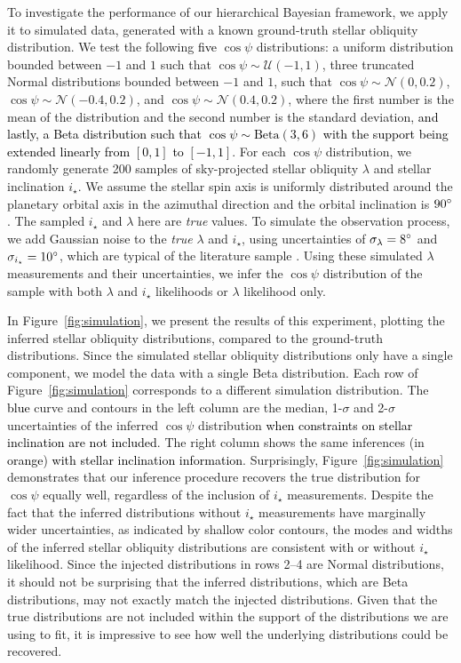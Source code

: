 \documentclass[twocolumn,times]{aastex631}
\newcommand{\edits}[1]{\textcolor{black}{#1}}
\begin{document}
To investigate the performance of our hierarchical Bayesian framework, we apply it to simulated data, generated with a known ground-truth stellar obliquity distribution.
We test the following \edits{five} $\cos{\psi}$ distributions: a uniform distribution bounded between $-1$ and $1$ such that $\cos{\psi} \sim \mathcal{U}(-1,1)$, three truncated Normal distributions bounded between $-1$ and $1$, such that $\cos{\psi} \sim \mathcal{N}(0, 0.2)$, $\cos{\psi} \sim \mathcal{N}(-0.4, 0.2)$, and $\cos{\psi} \sim \mathcal{N}(0.4, 0.2)$, where the first number is the mean of the distribution and the second number is the standard deviation, \edits{and lastly, a Beta distribution such that $\cos{\psi} \sim \mathrm{Beta}(3, 6)$ with the support being extended linearly from $[0, 1]$ to $[-1, 1]$}.
For each $\cos{\psi}$ distribution, we randomly generate 200 samples of sky-projected stellar obliquity $\lambda$ and stellar inclination $i_\star$. We assume the stellar spin axis is uniformly distributed around the planetary orbital axis in the azimuthal direction and the orbital inclination is $90\mbox{$^\circ$}$.
The sampled $i_\star$ and $\lambda$ here are \emph{true} values. 
To simulate the observation process, we add Gaussian noise to the \emph{true} $\lambda$ and $i_\star$, using uncertainties of $\sigma_{\lambda} = 8\mbox{$^\circ$}$ and $\sigma_{i_\star} = 10\mbox{$^\circ$}$, which are typical of the literature sample \cite{Albrecht22}.
Using these simulated $\lambda$ measurements and their uncertainties, we infer the $\cos{\psi}$ distribution of the sample with both $\lambda$ and $i_\star$ likelihoods or $\lambda$ likelihood only.

In Figure~\ref{fig:simulation}, we present the results of this experiment, plotting the inferred stellar obliquity distributions, compared to the ground-truth distributions.
Since the simulated stellar obliquity distributions only have a single component, we model the data with a single Beta distribution.
Each row of Figure~\ref{fig:simulation} corresponds to a different simulation distribution. The \edits{blue} curve and contours in the left column are the median, 1-$\sigma$ and 2-$\sigma$ uncertainties of the inferred $\cos{\psi}$ distribution \edits{when constraints on stellar inclination are not included}.
The right column shows the same inferences (in \edits{orange}) \edits{with stellar inclination information}.
Surprisingly, Figure~\ref{fig:simulation} demonstrates that our inference procedure recovers the true distribution for $\cos{\psi}$ equally well, regardless of the inclusion of $i_\star$ measurements.
Despite the fact that the inferred distributions without $i_\star$ measurements have marginally wider uncertainties, as indicated by shallow color contours, the modes and widths of the inferred stellar obliquity distributions are consistent with or without $i_\star$ likelihood.
Since the injected distributions in rows 2--4 are Normal distributions, it should not be surprising that the inferred distributions, which are Beta distributions, may not exactly match the injected distributions. Given that the true distributions are not included within the support of the distributions we are using to fit, it is impressive to see how well the underlying distributions could be recovered.
\end{document}
